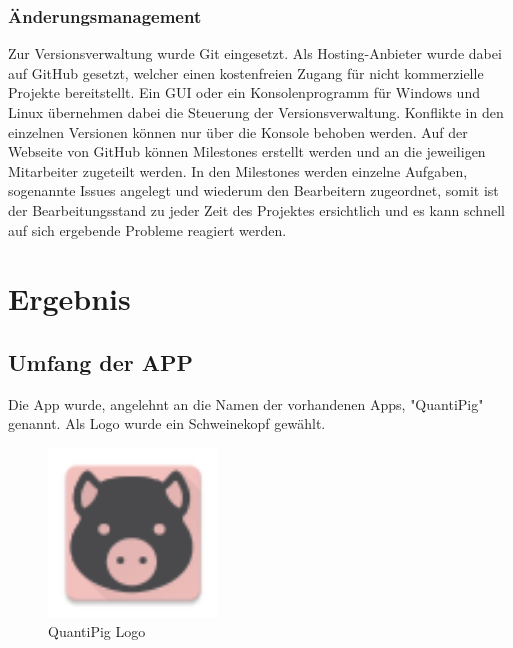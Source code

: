 \subsubsection{Änderungsmanagement}
Zur Versionsverwaltung wurde Git eingesetzt. Als Hosting-Anbieter wurde dabei auf GitHub gesetzt, welcher einen kostenfreien Zugang für nicht kommerzielle Projekte bereitstellt. Ein \ac{GUI} oder ein Konsolenprogramm für Windows und Linux übernehmen dabei die Steuerung der Versionsverwaltung. Konflikte in den einzelnen Versionen können nur über die Konsole behoben werden. Auf der Webseite von GitHub können Milestones erstellt werden und an die jeweiligen Mitarbeiter zugeteilt werden. In den Milestones werden einzelne Aufgaben, sogenannte Issues angelegt und wiederum den Bearbeitern zugeordnet, somit ist der Bearbeitungsstand zu jeder Zeit des Projektes ersichtlich und es kann schnell auf sich ergebende Probleme reagiert werden.




\section{Ergebnis}
\subsection{Umfang der APP}
Die App wurde, angelehnt an die Namen der vorhandenen Apps, "QuantiPig" genannt. Als Logo wurde ein Schweinekopf gewählt.
\begin{figure}[h]
	\centering
		\includegraphics[width=0.4\textwidth]{img/ic_launcher.png}
	\caption[QuantiPig Logo]{QuantiPig Logo}
	\label{fig:pig_logo}
\end{figure}

